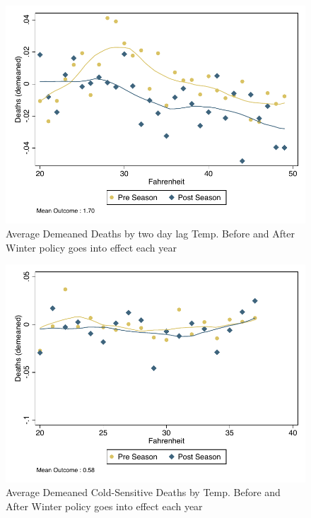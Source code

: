 \documentclass[12pt]{article}
\begin{document}
\begin{figure}
\centering
\caption{Average Demeaned Deaths by  two day lag Temp. Before and After Winter policy goes into effect each year}
\includegraphics[scale=.8]{figures/tgrad_deaths_all_lag2.pdf}
\end{figure}



\begin{figure}
\centering
\caption{Average Demeaned Cold-Sensitive Deaths by Temp. Before and After Winter policy goes into effect each year}
\includegraphics[scale=.8]{figures/tgrad_deaths_ewm.pdf}
\end{figure}
\end{document}
